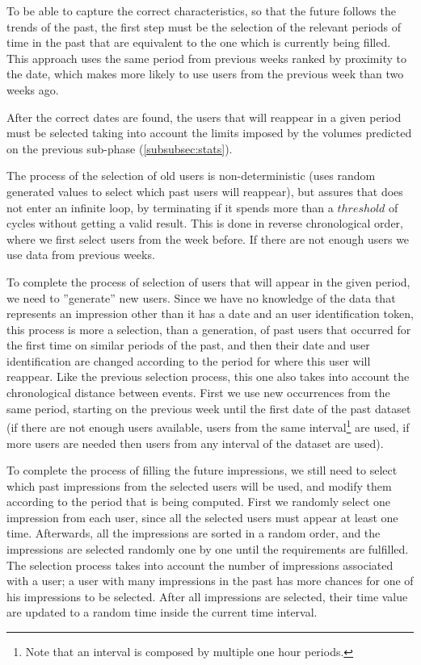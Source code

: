 To be able to capture the correct characteristics, so that the future follows the
trends of the past, the first step must be the selection of the relevant periods of
time in the past that are equivalent to the one which is currently being filled.
This approach uses the same period from previous weeks ranked by proximity to
the date, which makes more likely to use users from the previous week than two
weeks ago.

After the correct dates are found, the users that will reappear in a given
period must be selected taking into account the limits imposed by the volumes
predicted on the previous sub-phase (\ref{subsubsec:stats}).

The process of the selection of old users is non-deterministic (uses random generated
values to select which past users will reappear), but assures that does not enter
an infinite loop, by terminating if it spends more than a $threshold$ of cycles
without getting a valid result. This is done in reverse chronological order,
where we first select users from the week before. If there are not enough
users we use data from previous weeks.

To complete the process of selection of users that will appear in the given
period, we need to ''generate'' new users. Since we have no knowledge of the
data that represents an impression other than it has a date and an user
identification token, this process is more a selection, than a generation, of
past users that occurred for the first time on similar periods of the past, and
then their date and user identification are changed according to the period for
where this user will reappear. Like the previous selection process, this one also
takes into account the chronological distance between events. First we use new
occurrences from the same period, starting on the previous week until the first date
of the past dataset (if there are not enough users available, users from the
same interval\footnote{Note that an interval is composed by multiple one hour
periods.} are used, if more users are needed then users from any interval of the
dataset are used).

To complete the process of filling the future impressions, we still need to
select which past impressions from the selected users will be used, and modify
them according to the period that is being computed. First we randomly
select one impression from each user, since all the selected users must appear at
least one time. Afterwards, all the impressions are sorted in a random order, and
the impressions are selected randomly one by one until the requirements are
fulfilled.
The selection process takes into account the number of impressions associated
with a user; a user with many impressions in the past has more chances for one
of his impressions to be selected.
After all impressions are selected, their time value are updated to a random time
inside the current time interval.

